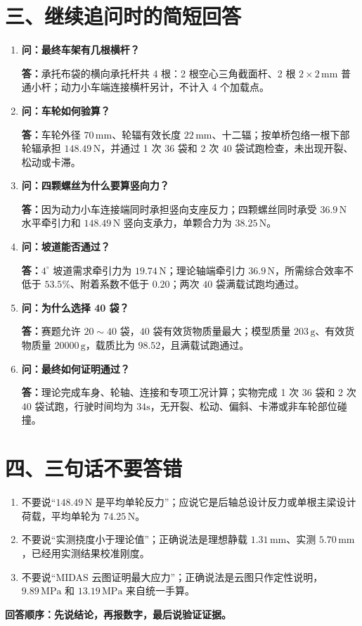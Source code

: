\documentclass[UTF8,a4paper,11pt,fontset=none]{ctexart}
\newcommand{\mm}{\,\mathrm{mm}}
\newcommand{\N}{\,\mathrm{N}}
\newcommand{\g}{\,\mathrm{g}}
\newcommand{\MPa}{\,\mathrm{MPa}}
\newcommand{\q}[2]{\item \textbf{问：#1}\par\textbf{答：}#2}
\begin{document}
\newpage
\section*{三、继续追问时的简短回答}
\begin{enumerate}[start=7]
\q{最终车架有几根横杆？}{承托布袋的横向承托杆共 4 根：2 根空心三角截面杆、2 根 $2\times2\mm$ 普通小杆；动力小车端连接横杆另计，不计入 4 个加载点。}
\q{车轮如何验算？}{车轮外径 $70\mm$、轮辐有效长度 $22\mm$、十二辐；按单桥包络一根下部轮辐承担 $148.49\N$，并通过 1 次 $36$ 袋和 2 次 $40$ 袋试跑检查，未出现开裂、松动或卡滞。}
\q{四颗螺丝为什么要算竖向力？}{因为动力小车连接端同时承担竖向支座反力；四颗螺丝同时承受 $36.9\N$ 水平牵引力和 $148.49\N$ 竖向支承力，单颗合力为 $38.25\N$。}
\q{坡道能否通过？}{$4^\circ$ 坡道需求牵引力为 $19.74\N$；理论轴端牵引力 $36.9\N$，所需综合效率不低于 $53.5\%$、附着系数不低于 $0.20$；两次 $40$ 袋满载试跑均通过。}
\q{为什么选择 40 袋？}{赛题允许 $20\sim40$ 袋，$40$ 袋有效货物质量最大；模型质量 $203\g$、有效货物质量 $20000\g$，载质比为 $98.52$，且满载试跑通过。}
\q{最终如何证明通过？}{理论完成车身、轮轴、连接和专项工况计算；实物完成 1 次 $36$ 袋和 2 次 $40$ 袋试跑，行驶时间均为 $34\mathrm{s}$，无开裂、松动、偏斜、卡滞或非车轮部位碰撞。}
\end{enumerate}

\section*{四、三句话不要答错}
\begin{enumerate}
  \item 不要说“$148.49\N$ 是平均单轮反力”；应说它是后轴总设计反力或单根主梁设计荷载，平均单轮为 $74.25\N$。
  \item 不要说“实测挠度小于理论值”；正确说法是理想静载 $1.31\mm$、实测 $5.70\mm$，已经用实测结果校准刚度。
  \item 不要说“MIDAS 云图证明最大应力”；正确说法是云图只作定性说明，$9.89\MPa$ 和 $13.19\MPa$ 来自统一手算。
\end{enumerate}

\vfill
\begin{center}\small\textbf{回答顺序：先说结论，再报数字，最后说验证证据。}\end{center}
\end{document}
